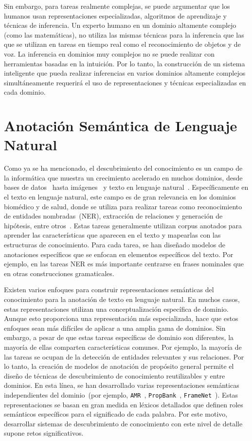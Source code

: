 Sin embargo, para tareas realmente complejas, se puede argumentar que los humanos usan representaciones especializadas, algoritmos de aprendizaje y técnicas de inferencia.
Un experto humano en un dominio altamente complejo (como las matemáticas), no utiliza las mismas técnicas para la inferencia que las que se utilizan en tareas en tiempo real como el reconocimiento de objetos y de voz.
La inferencia en dominios muy complejos no se puede realizar con herramientas basadas en la intuición.
Por lo tanto, la construcción de un sistema inteligente que pueda realizar inferencias en varios dominios altamente complejos simultáneamente requerirá el uso de representaciones y técnicas especializadas en cada dominio.

\section{Anotación Semántica de Lenguaje Natural}\label{sec:sota-annotation}

Como ya se ha mencionado, el descubrimiento del conocimiento es un campo de la informática que muestra un crecimiento acelerado en muchos dominios, desde bases de datos~\cite{fayyad1996data, knowledgeDatabase} hasta imágenes~\cite{lu2016visual} y texto en lenguaje natural~\cite{carlson2010toward}.
Específicamente en el texto en lenguaje natural, este campo es de gran relevancia en los dominios biomédico y de salud, donde se utiliza para realizar tareas como
reconocimiento de entidades nombradas~(NER), extracción de relaciones y generación de hipótesis, entre otros~\cite{simpson2012biomedical}.
Estas tareas generalmente utilizan corpus anotados para aprender las características que aparecen en el texto y mapearlas con las estructuras de conocimiento.
Para cada tarea, se han diseñado modelos de anotaciones específicos que se enfocan en elementos específicos del texto.
Por ejemplo, en las tareas NER es más importante centrarse en frases nominales que en otras construcciones gramaticales.

Existen varios enfoques para construir representaciones semánticas del conocimiento para la anotación de texto en lenguaje natural.
En muchos casos, estas representaciones utilizan una conceptualización específica de dominio.
Aunque esto proporciona una representación más especializada, hace que estos enfoques sean más difíciles de aplicar a una amplia gama de dominios.
Sin embargo, a pesar de que estas tareas específicas de dominio son diferentes, la mayoría de ellas comparten características comunes.
Por ejemplo, la mayoría de las tareas se ocupan de la detección de entidades relevantes y sus relaciones.
Por lo tanto, la creación de modelos de anotación de propósito general permite el diseño de técnicas de descubrimiento de conocimiento reutilizables y entre dominios.
En esta línea, se han desarrollado varias representaciones semánticas independientes del dominio~(por ejemplo, \texttt{AMR}~\cite{amr}, \texttt{PropBank}~\cite{propbank}, \texttt{FrameNet}~\cite{framenet}).
Estas representaciones se basan en gran medida en léxicos detallados que definen roles semánticos específicos para el significado de cada palabra.
Por este motivo, desarrollar sistemas de descubrimiento de conocimiento con este nivel de detalle supone retos significativos.

